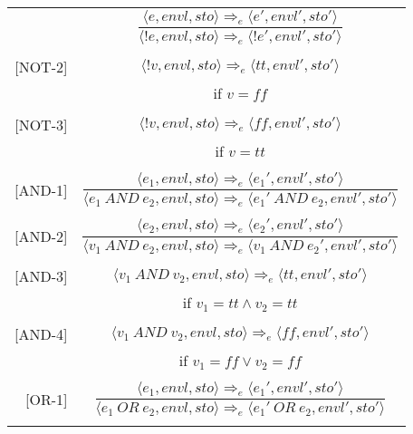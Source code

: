 \begin{longtable}[c] { r c }
  \centering
  [NOT-1] & \( 
    \dfrac { \langle e, envl, sto \rangle \Rightarrow_e \langle e', envl', sto' \rangle }
      { \langle !e, envl, sto \rangle \Rightarrow_e \langle !e', envl', sto' \rangle } \)
  \\
  & \\

  [NOT-2] & \( 
    \langle !v, envl, sto \rangle \Rightarrow_e \langle tt, envl', sto' \rangle \)
  \\
  & if \( v = ff\) \\
  & \\

  [NOT-3] & \( 
    \langle !v, envl, sto \rangle \Rightarrow_e \langle ff, envl', sto' \rangle \)
  \\
  & if \( v = tt \) \\
  & \\

  [AND-1] & \( 
    \dfrac { \langle e_1, envl, sto \rangle \Rightarrow_e \langle e_1', envl', sto' \rangle }
      { \langle e_1 \ AND \ e_2, envl, sto \rangle \Rightarrow_e \langle e_1' \ AND \ e_2, envl', sto' \rangle } \)
  \\
  & \\

  [AND-2] & \( 
    \dfrac { \langle e_2, envl, sto \rangle \Rightarrow_e \langle e_2', envl', sto' \rangle }
      { \langle v_1 \ AND \ e_2, envl, sto \rangle \Rightarrow_e \langle v_1 \ AND \ e_2', envl', sto' \rangle } \)
  \\
  & \\

  [AND-3] & \( 
    \langle v_1 \ AND \ v_2, envl, sto \rangle \Rightarrow_e \langle tt, envl', sto' \rangle \)
  \\
  & if \( v_1 = tt \land v_2 = tt\) \\
  & \\

  [AND-4] & \( 
    \langle v_1 \ AND \ v_2, envl, sto \rangle \Rightarrow_e \langle ff, envl', sto' \rangle \)
  \\
  & if \( v_1 = ff \lor  v_2 = ff \) \\
  & \\

  [OR-1] & \( 
    \dfrac { \langle e_1, envl, sto \rangle \Rightarrow_e \langle e_1', envl', sto' \rangle }
      { \langle e_1 \ OR \ e_2, envl, sto \rangle \Rightarrow_e \langle e_1' \ OR \ e_2, envl', sto' \rangle } \)
  \\
  & \\


\end{longtable}
